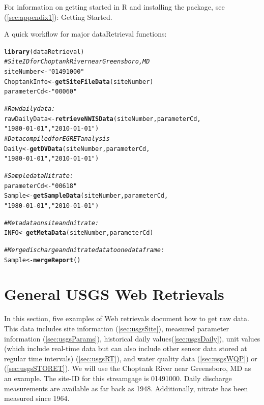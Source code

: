 \documentclass[a4paper,11pt]{article}\usepackage[]{graphicx}\usepackage[]{color}
\makeatletter
\newcommand{\hlstr}[1]{\textcolor[rgb]{0.192,0.494,0.8}{#1}}%
\newcommand{\hlcom}[1]{\textcolor[rgb]{0.678,0.584,0.686}{\textit{#1}}}%
\newcommand{\hlstd}[1]{\textcolor[rgb]{0.345,0.345,0.345}{#1}}%
\newcommand{\hlkwb}[1]{\textcolor[rgb]{0.69,0.353,0.396}{#1}}%
\newcommand{\hlkwd}[1]{\textcolor[rgb]{0.737,0.353,0.396}{\textbf{#1}}}%
\newenvironment{kframe}{%
 \def\at@end@of@kframe{}%
 \ifinner\ifhmode%
  \def\at@end@of@kframe{\end{minipage}}%
  \begin{minipage}{\columnwidth}%
 \fi\fi%
 \def\FrameCommand##1{\hskip\@totalleftmargin \hskip-\fboxsep
 \colorbox{shadecolor}{##1}\hskip-\fboxsep
     \hskip-\linewidth \hskip-\@totalleftmargin \hskip\columnwidth}%
 \MakeFramed {\advance\hsize-\width
   \@totalleftmargin\z@ \linewidth\hsize
   \@setminipage}}%
 {\par\unskip\endMakeFramed%
 \at@end@of@kframe}
\newenvironment{knitrout}{}{} %
\makeatother
\begin{document}
For information on getting started in R and installing the package, see (\ref{sec:appendix1}): Getting Started.

A quick workflow for major dataRetrieval functions:

\begin{knitrout}
\color{fgcolor}\begin{kframe}
\begin{alltt}
\hlkwd{library}\hlstd{(dataRetrieval)}
\hlcom{# Site ID for Choptank River near Greensboro, MD}
\hlstd{siteNumber} \hlkwb{<-} \hlstr{"01491000"}
\hlstd{ChoptankInfo} \hlkwb{<-} \hlkwd{getSiteFileData}\hlstd{(siteNumber)}
\hlstd{parameterCd} \hlkwb{<-} \hlstr{"00060"}

\hlcom{#Raw daily data:}
\hlstd{rawDailyData} \hlkwb{<-} \hlkwd{retrieveNWISData}\hlstd{(siteNumber,parameterCd,}
                      \hlstr{"1980-01-01"}\hlstd{,}\hlstr{"2010-01-01"}\hlstd{)}
\hlcom{# Data compiled for EGRET analysis}
\hlstd{Daily} \hlkwb{<-} \hlkwd{getDVData}\hlstd{(siteNumber,parameterCd,}
                      \hlstr{"1980-01-01"}\hlstd{,}\hlstr{"2010-01-01"}\hlstd{)}

\hlcom{# Sample data Nitrate:}
\hlstd{parameterCd} \hlkwb{<-} \hlstr{"00618"}
\hlstd{Sample} \hlkwb{<-} \hlkwd{getSampleData}\hlstd{(siteNumber,parameterCd,}
                      \hlstr{"1980-01-01"}\hlstd{,}\hlstr{"2010-01-01"}\hlstd{)}

\hlcom{# Metadata on site and nitrate:}
\hlstd{INFO} \hlkwb{<-} \hlkwd{getMetaData}\hlstd{(siteNumber,parameterCd)}

\hlcom{# Merge discharge and nitrate data to one dataframe:}
\hlstd{Sample} \hlkwb{<-} \hlkwd{mergeReport}\hlstd{()}
\end{alltt}
\end{kframe}
\end{knitrout}


\section{General USGS Web Retrievals}
\label{sec:genRetrievals}
In this section, five examples of Web retrievals document how to get raw data. This data includes site information (\ref{sec:usgsSite}), measured parameter information (\ref{sec:usgsParams}), historical daily values(\ref{sec:usgsDaily}), unit values (which include real-time data but can also include other sensor data stored at regular time intervals) (\ref{sec:usgsRT}), and water quality data (\ref{sec:usgsWQP}) or (\ref{sec:usgsSTORET}). We will use the Choptank River near Greensboro, MD as an example.  The site-ID for this streamgage is 01491000. Daily discharge measurements are available as far back as 1948.  Additionally, nitrate has been measured since 1964. 
\end{document}
